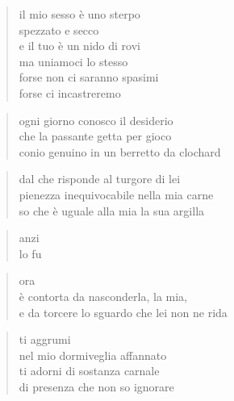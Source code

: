 
\vspace*{2cm}

	\begin{verse}
		il mio sesso è uno sterpo\\
		spezzato e secco\\
		e il tuo è un nido di rovi\\
		ma uniamoci lo stesso\\
		forse non ci saranno spasimi\\
		forse ci incastreremo
	\end{verse}

\clearpage


\vspace*{2cm}

	\begin{verse}
		ogni giorno conosco il desiderio\\
		che la passante getta per gioco\\
		conio genuino in un berretto da clochard
	\end{verse}

	\begin{verse}
		dal che risponde al turgore di lei\\
		pienezza inequivocabile nella mia carne\\
		so che è uguale alla mia la sua argilla
	\end{verse}

	\begin{verse}
		anzi\\
		lo fu
	\end{verse}

	\begin{verse}
		ora\\
		è contorta da nasconderla, la mia,\\
		e da torcere lo sguardo che lei non ne rida
	\end{verse}

\clearpage


\vspace*{2cm}

	\begin{verse}
		ti aggrumi\\
		nel mio dormiveglia affannato\\
		ti adorni di sostanza carnale\\
		di presenza che non so ignorare
	\end{verse}

